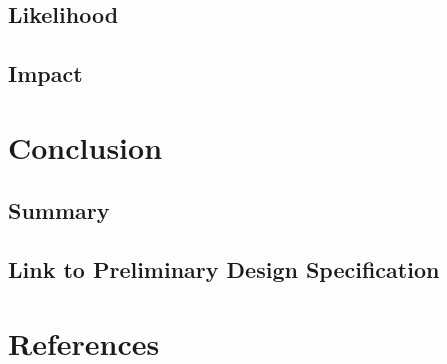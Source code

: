 \documentclass[]{report}
\begin{document}
\section{Likelihood}

\section{Impact}

\chapter{Conclusion}

\section{Summary}

\section{Link to Preliminary Design Specification}

\chapter*{References}
\end{document}
